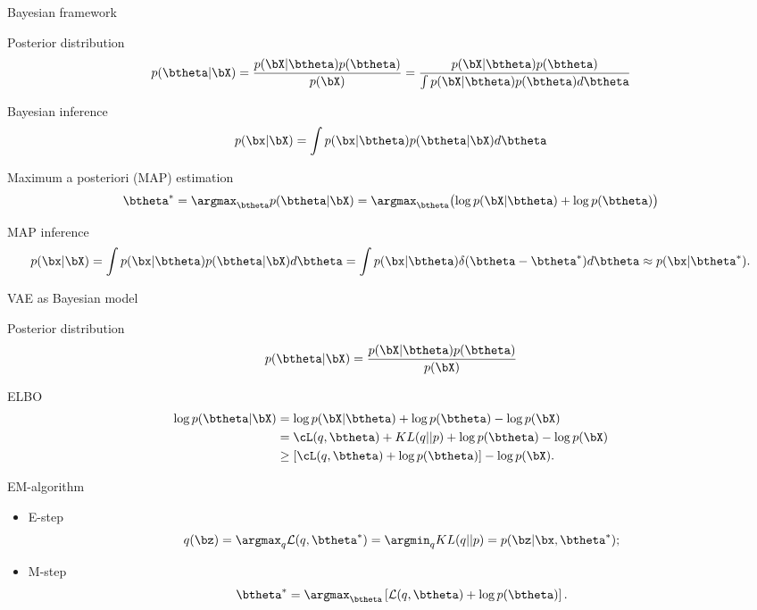 \begin{frame}{Bayesian framework}
	\begin{block}{Posterior distribution}
		\vspace{-0.2cm}
		\[
			p(\btheta | \bX) = \frac{p(\bX | \btheta) p(\btheta)}{p(\bX)} = \frac{p(\bX | \btheta) p(\btheta)}{\int p(\bX | \btheta) p(\btheta) d \btheta} 
		\]
		\vspace{-0.2cm}
	\end{block}
	\begin{block}{Bayesian inference}
		\vspace{-0.3cm}
		\[
			p(\bx | \bX) = \int p(\bx | \btheta) p(\btheta | \bX) d \btheta
		\]
	\end{block}
    \begin{block}{Maximum a posteriori (MAP) estimation}
    \vspace{-0.2cm}
    \[
        \btheta^* = \argmax_{\btheta} p(\btheta | \bX) = \argmax_{\btheta} \bigl(\log p(\bX | \btheta) + \log p(\btheta) \bigr)
    \]
    \end{block}
	\begin{block}{MAP inference}
		\vspace{-0.4cm}
		\[
			p(\bx | \bX) = \int p(\bx| \btheta) p(\btheta | \bX ) d \btheta =  \int p(\bx| \btheta) \delta (\btheta - \btheta^* ) d \btheta \approx p(\bx | \btheta^*).
		\]
	\end{block}
\end{frame}
\begin{frame}{VAE as Bayesian model}
	\begin{block}{Posterior distribution}
		\vspace{-0.2cm}
		\[
			p(\btheta | \bX) = \frac{p(\bX | \btheta) p(\btheta)}{p(\bX)}
		\]
		\vspace{-0.5cm}
	\end{block}
	\begin{block}{ELBO}
		\vspace{-0.5cm}
		\begin{align*}
			 \log p(\btheta | \bX) &= \log p(\bX | \btheta) + \log p(\btheta) - \log p(\bX) \\
			 &= \cL(q, \btheta) + KL(q || p) + \log p(\btheta) - \log p(\bX) \\
			 &\geq \left[ \cL(q, \btheta) + \log p(\btheta) \right] - \log p(\bX) .
		\end{align*}
		\vspace{-0.7cm}
	\end{block}
	\begin{block}{EM-algorithm}
		\begin{itemize}
			\item E-step
				\vspace{-0.2cm}
				\[
					q(\bz) = \argmax_q \mathcal{L} (q, \btheta^*) = \argmin_q KL(q || p) =
				 p(\bz| \bx, \btheta^*);
				\]
				\vspace{-0.5cm}
			\item M-step
				\[
					\btheta^* = \argmax_{\btheta} \left[ \mathcal{L} (q, \btheta) + \log p(\btheta) \right].
				\]
		\end{itemize}
	\end{block}
\end{frame}
